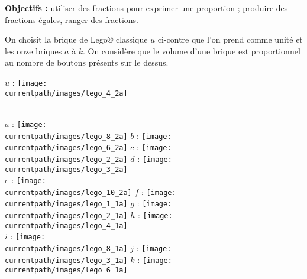 \begin{activite}
    \begin{changemargin}{-10mm}{-15mm}
        \vspace*{-5mm}
        {\bf Objectifs :} utiliser des fractions pour exprimer une proportion ; produire des fractions égales, ranger des fractions. \\
        \vspace*{-5mm}
            \begin{minipage}{0.65\linewidth}
                On choisit la brique de Lego® classique $u$ ci-contre que l'on prend comme unité et les onze briques $a$ à $k$. On considère que le volume d'une brique est proportionnel au nombre de \og boutons \fg{} présents sur le dessus.
            \end{minipage}
            \hfill
            \begin{minipage}{0.3\linewidth}
                $u$ : \texttt{[image: \\currentpath/images/lego\_4\_2a]}
            \end{minipage} \\ [10mm]
                $a$ : \texttt{[image: \\currentpath/images/lego\_8\_2a]} \qquad 
                $b$ : \texttt{[image:  \\currentpath/images/lego\_6\_2a]} \qquad
                $c$ : \texttt{[image: \\currentpath/images/lego\_2\_2a]} \qquad
                $d$ : \texttt{[image:  \\currentpath/images/lego\_3\_2a]} \\ [5mm]
                $e$ : \texttt{[image:  \\currentpath/images/lego\_10\_2a]} \qquad
                $f$ : \texttt{[image:  \\currentpath/images/lego\_1\_1a]} \qquad
                $g$ : \texttt{[image: \\currentpath/images/lego\_2\_1a]} \qquad
                $h$ : \texttt{[image:  \\currentpath/images/lego\_4\_1a]} \\ [5mm]
                $i$ : \texttt{[image:  \\currentpath/images/lego\_8\_1a]} \qquad
                $j$ : \texttt{[image: \\currentpath/images/lego\_3\_1a]} \qquad
                $k$ : \texttt{[image: \\currentpath/images/lego\_6\_1a]} \\
                

\end{changemargin}
\end{activite}
